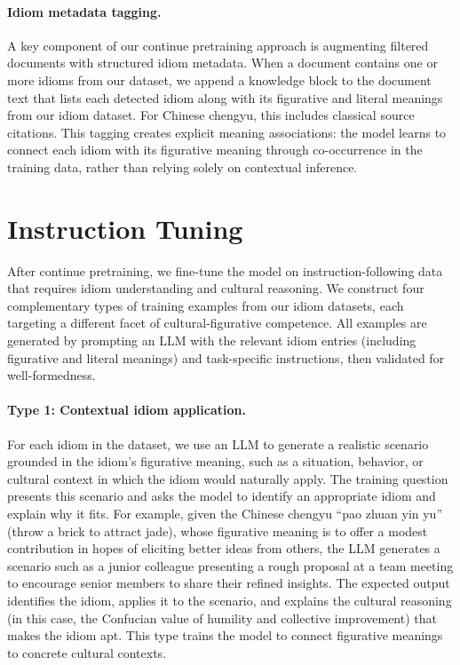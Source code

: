 \documentclass[11pt,a4paper]{article}
\begin{document}
\paragraph{Idiom metadata tagging.} A key component of our continue pretraining approach is augmenting filtered documents with structured idiom metadata. When a document contains one or more idioms from our dataset, we append a knowledge block to the document text that lists each detected idiom along with its figurative and literal meanings from our idiom dataset. For Chinese chengyu, this includes classical source citations. This tagging creates explicit meaning associations: the model learns to connect each idiom with its figurative meaning through co-occurrence in the training data, rather than relying solely on contextual inference.

\section{Instruction Tuning}

After continue pretraining, we fine-tune the model on instruction-following data that requires idiom understanding and cultural reasoning. We construct four complementary types of training examples from our idiom datasets, each targeting a different facet of cultural-figurative competence. All examples are generated by prompting an LLM with the relevant idiom entries (including figurative and literal meanings) and task-specific instructions, then validated for well-formedness.

\paragraph{Type 1: Contextual idiom application.} For each idiom in the dataset, we use an LLM to generate a realistic scenario grounded in the idiom's figurative meaning, such as a situation, behavior, or cultural context in which the idiom would naturally apply. The training question presents this scenario and asks the model to identify an appropriate idiom and explain why it fits. For example, given the Chinese chengyu ``pao zhuan yin yu'' (throw a brick to attract jade), whose figurative meaning is to offer a modest contribution in hopes of eliciting better ideas from others, the LLM generates a scenario such as a junior colleague presenting a rough proposal at a team meeting to encourage senior members to share their refined insights. The expected output identifies the idiom, applies it to the scenario, and explains the cultural reasoning (in this case, the Confucian value of humility and collective improvement) that makes the idiom apt. This type trains the model to connect figurative meanings to concrete cultural contexts.
\end{document}
